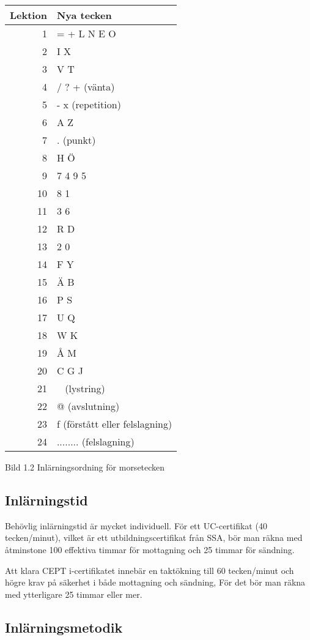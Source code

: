 \begin{center}
\begin{tabular}{|r|l|}
\hline
Lektion & Nya tecken \\ \hline
1 & = + L N E O \\
2 & I X \\
3 & V T \\
4 & / ? + (vänta) \\
5 & - x (repetition) \\
6 & A Z \\
7 & . (punkt) \\
8 & H Ö \\
9 & 7 4 9 5 \\
10 & 8 1 \\
11 & 3 6 \\
12 & R D \\
13 & 2 0 \\
14 & F Y \\
15 & Ä B \\
16 & P S \\
17 & U Q \\
18 & W K \\
19 & Å M \\
20 & C G J \\
21 & ~ (lystring) \\
22 & @ (avslutning) \\
23 & f (förstått eller felslagning) \\
24 & ........ (felslagning) \\
\hline
\end{tabular}
\end{center}

Bild 1.2 Inlärningsordning för morsetecken

\subsection{Inlärningstid}

Behövlig inlärningstid är mycket individuell. För ett UC-certifikat (40 tecken/minut),
vilket är ett utbildningscertifikat från SSA, bör man räkna med åtminstone 100 effektiva
timmar för mottagning och 25 timmar för sändning.

Att klara CEPT i-certifikatet innebär en taktökning till 60 tecken/minut och högre
krav på säkerhet i både mottagning och sändning, För det bör man räkna med ytterligare
25 timmar eller mer.

\subsection{Inlärningsmetodik}

